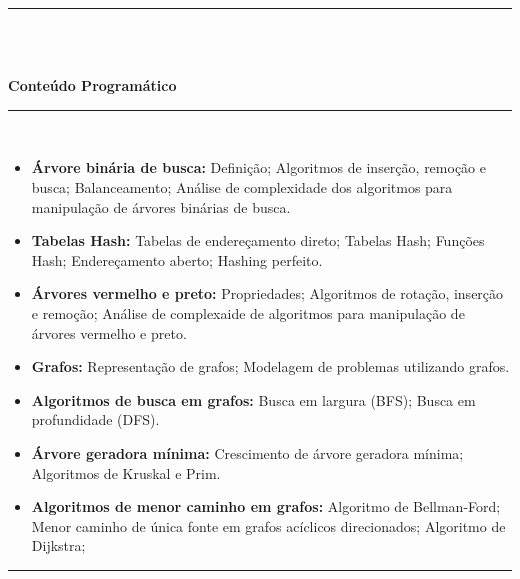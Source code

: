 \noindent\rule{16.5cm}{0.4pt}\\
\\
\vspace{-12mm}
\begin{center}\textbf{Conteúdo Programático}\end{center}
\vspace{-5mm}
\noindent\rule{16.5cm}{0.4pt}
\\
\begin{itemize}
 \item \textbf{\'Arvore bin\'aria de busca:} Defini\c{c}\~ao; Algoritmos de inser\c{c}\~ao, remo\c{c}\~ao e busca; Balanceamento; An\'alise de complexidade dos algoritmos para manipula\c{c}\~ao de \'arvores bin\'arias de busca.


 \item \textbf{Tabelas Hash:} Tabelas de endere\c{c}amento direto; Tabelas Hash; Fun\c{c}\~oes Hash; Endere\c{c}amento aberto; Hashing perfeito.

 \item \textbf{\'Arvores vermelho e preto:} Propriedades; Algoritmos de rota\c{c}\~ao, inser\c{c}\~ao e remo\c{c}\~ao; An\'alise de complexaide de algoritmos para manipula\c{c}\~ao de \'arvores vermelho e preto.

 \item \textbf{Grafos:} Representa\c{c}\~ao de grafos; Modelagem de problemas utilizando grafos.

 \item \textbf{Algoritmos de busca em grafos:} Busca em largura (BFS); Busca em profundidade (DFS).

 \item \textbf{\'Arvore geradora m\'inima:} Crescimento de \'arvore geradora m\'inima; Algoritmos de Kruskal e Prim.

 \item \textbf{Algoritmos de menor caminho em grafos:} Algoritmo de Bellman-Ford; Menor caminho de \'unica fonte em grafos ac\'iclicos direcionados; Algoritmo de Dijkstra; 

\end{itemize}
\noindent\rule{16.5cm}{0.4pt}\\
\\
